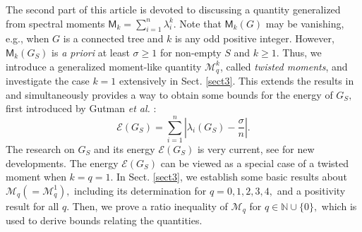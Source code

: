 \documentclass[12pt,a4paper,reqno]{amsart}
\numberwithin{equation}{section}
\theoremstyle{plain}
\theoremstyle{definition}
\newcommand{\<}{\langle}
\renewcommand{\>}{\rangle}
\newcommand{\cE}{{\mathcal E}}
\newcommand{\cM}{{\mathcal M}}
\newcommand{\N}{{\mathbb N}}
\newcommand{\R}{{\mathbb R}}
\begin{document}


The second part of this article is devoted to discussing a quantity generalized from spectral moments $\mathsf{M}_k= \sum^n_{i=1} \lambda^k_i$. Note that $\mathsf{M}_k(G)$ may be vanishing, e.g., when $G$ is a connected tree and $k$ is any odd positive integer. However, $\mathsf{M}_k(G_S)$ is \textit{a priori} at least $\sigma \geq 1$ for non-empty $S$ and $k\geq 1.$ %
Thus, we introduce a generalized moment-like quantity $\cM^k_q$, called \textit{twisted moments}, and investigate the case $k=1$ extensively in Sect. \ref{sect3}. This extends the results in \cite{Zhou2007} and simultaneously provides a way to obtain some bounds for the energy of $G_S,$ first introduced by Gutman \textit{et al.} \cite{gutman2021energy}: 
\begin{equation}
\label{eq:energy}
 \cE(G_S) = \sum^n_{i=1} \left| \lambda_i(G_S) - \frac{\sigma}{n}\right|.  
\end{equation}
The research on $G_S$ and its energy $\cE(G_S)$ is very current, see \cite{akbari2023selfloop,akbari2024line, jovanovic2023,rakshith2024,ShettyBhat2023} for new developments.  
The energy $\cE(G_S)$ can be viewed as a special case of a twisted moment when $k=q=1.$ 
In Sect. \ref{sect3}, we establish some basic results about $\cM_q (=\cM^1_q),$ including its determination for $q=0,1,2,3,4,$ and a positivity result for all $q.$ Then, we prove a ratio inequality of $\cM_q$ for $q \in \N \cup \{0\},$ which is used to derive bounds relating the quantities. 
\end{document}
